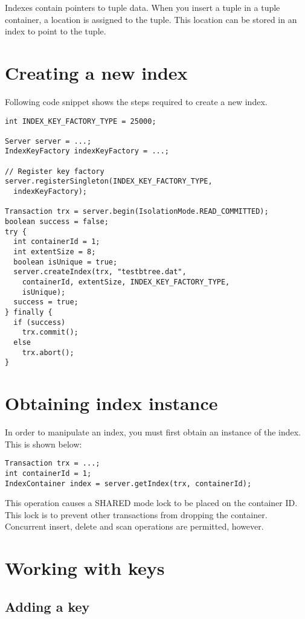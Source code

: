 \documentclass[a4paper,draft,oneside]{book}
\begin{document}
Indexes contain pointers to tuple data. When you insert a tuple in a
tuple container, a location is assigned to the tuple. This location
can be stored in an index to point to the tuple.

\section{Creating a new index}

Following code snippet shows the steps required to create a new
index.

\begin{verbatim}
int INDEX_KEY_FACTORY_TYPE = 25000;

Server server = ...;
IndexKeyFactory indexKeyFactory = ...;

// Register key factory
server.registerSingleton(INDEX_KEY_FACTORY_TYPE, 
  indexKeyFactory);

Transaction trx = server.begin(IsolationMode.READ_COMMITTED);
boolean success = false;
try {
  int containerId = 1;
  int extentSize = 8;
  boolean isUnique = true;
  server.createIndex(trx, "testbtree.dat", 
    containerId, extentSize, INDEX_KEY_FACTORY_TYPE, 
    isUnique);
  success = true;
} finally {
  if (success)
    trx.commit();
  else
    trx.abort();
}
\end{verbatim}

\section{Obtaining index instance}

In order to manipulate an index, you must first obtain an instance of
the index. This is shown below:

\begin{verbatim}
Transaction trx = ...;
int containerId = 1;
IndexContainer index = server.getIndex(trx, containerId);
\end{verbatim}

This operation causes a SHARED mode lock to be placed on the container
ID. This lock is to prevent other transactions from dropping the
container. Concurrent insert, delete and scan operations are
permitted, however.

\section{Working with keys}

\subsection{Adding a key}
\end{document}
